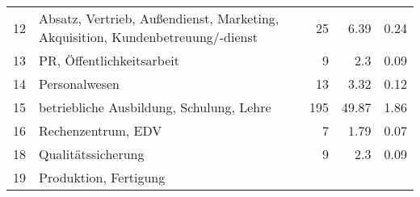\begin{longtable}{lXrrr}
     12 &
     \multicolumn{1}{X}{ Absatz, Vertrieb, Außendienst, Marketing, Akquisition, Kundenbetreuung/-dienst   } &


       \num{25} &
       \num[round-mode=places,round-precision=2]{6,39} &
         \num[round-mode=places,round-precision=2]{0,24} \\

     13 &
     \multicolumn{1}{X}{ PR, Öffentlichkeitsarbeit   } &


       \num{9} &
       \num[round-mode=places,round-precision=2]{2,3} &
         \num[round-mode=places,round-precision=2]{0,09} \\

     14 &
     \multicolumn{1}{X}{ Personalwesen   } &


       \num{13} &
       \num[round-mode=places,round-precision=2]{3,32} &
         \num[round-mode=places,round-precision=2]{0,12} \\

     15 &
     \multicolumn{1}{X}{ betriebliche Ausbildung, Schulung, Lehre   } &


       \num{195} &
       \num[round-mode=places,round-precision=2]{49,87} &
         \num[round-mode=places,round-precision=2]{1,86} \\

     16 &
     \multicolumn{1}{X}{ Rechenzentrum, EDV   } &


       \num{7} &
       \num[round-mode=places,round-precision=2]{1,79} &
         \num[round-mode=places,round-precision=2]{0,07} \\

     18 &
     \multicolumn{1}{X}{ Qualitätssicherung   } &


       \num{9} &
       \num[round-mode=places,round-precision=2]{2,3} &
         \num[round-mode=places,round-precision=2]{0,09} \\

     19 &
     \multicolumn{1}{X}{ Produktion, Fertigung   } &



\end{longtable}
